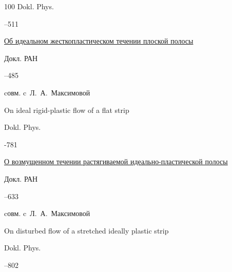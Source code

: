 \begin{thebibliography}{100}
\jour Dokl. Phys.




--511





\paper \href{http://mi.mathnet.ru/dan19480}{Об идеальном жесткопластическом течении плоской полосы}

\jour Докл. РАН




--485


\miscnote cовм. c~Л.~А.~Максимовой

\transl

\paper On ideal rigid-plastic flow of a flat strip

\jour Dokl. Phys.




-781





\paper \href{http://mi.mathnet.ru/dan19452}{О возмущенном течении растягиваемой идеально-пластической полосы}

\jour Докл. РАН




--633

\miscnote cовм. c~Л.~А.~Максимовой


\transl

\paper On disturbed flow of a stretched ideally plastic strip

\jour Dokl. Phys.




--802







\end{thebibliography}

